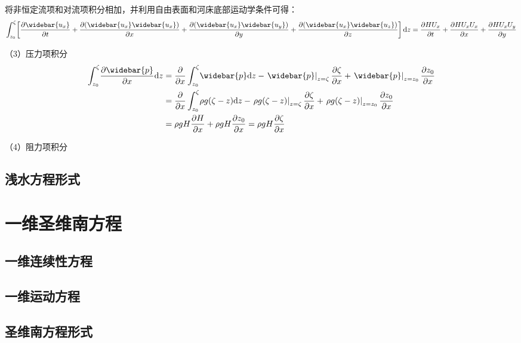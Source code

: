 将非恒定流项和对流项积分相加，并利用自由表面和河床底部运动学条件可得：
\begin{equation}
    \int_{z_{0}}^{\zeta}\!
    \left[
  \frac{\partial \widebar{u_{x}}}{\partial t} +
  \frac{\partial (\widebar{u_{x}}\widebar{u_{x}})}{\partial x} +
  \frac{\partial (\widebar{u_{x}}\widebar{u_{y}})}{\partial y} +
  \frac{\partial (\widebar{u_{x}}\widebar{u_{z}})}{\partial z}
  \right]
  \mathrm{d}z
=
\frac{\partial HU_{x}}{\partial t}
+
\frac{\partial HU_{x}U_{x}}{\partial x}
+
\frac{\partial HU_{x}U_{y}}{\partial y}
\end{equation}

（3）压力项积分
\begin{equation}
  \begin{aligned}
    \int_{z_{0}}^{\zeta}\!
    \frac{\partial \widebar{p}}{\partial x}
    \mathrm{d}z
    &=
    \frac{\partial}{\partial x}
    \int_{z_0}^{\zeta}\!
    \widebar{p}
    \mathrm{d}z
    -
    \left.\widebar{p}\right|_{z=\zeta}\frac{\partial \zeta}{\partial x}
    +
    \left.\widebar{p}\right|_{z=z_{0}}\frac{\partial z_{0}}{\partial x}
      \\
    &=
    \frac{\partial}{\partial x}
    \int_{z_0}^{\zeta}\!
    \rho g(\zeta-z)
    \mathrm{d}z
    -
    \left.\rho g(\zeta-z)\right|_{z=\zeta}\frac{\partial \zeta}{\partial x}
    +
    \left.\rho g(\zeta-z)\right|_{z=z_{0}}\frac{\partial z_{0}}{\partial x}
      \\
    &=
    \rho gH\frac{\partial H}{\partial x} 
    +
    \rho gH\frac{\partial z_{0}}{\partial x} 
    =
    \rho gH\frac{\partial \zeta}{\partial x} 
  \end{aligned}
\end{equation}

（4）阻力项积分

\subsection{浅水方程形式}

\section{一维圣维南方程}

\subsection{一维连续性方程}

\subsection{一维运动方程}

\subsection{圣维南方程形式}
